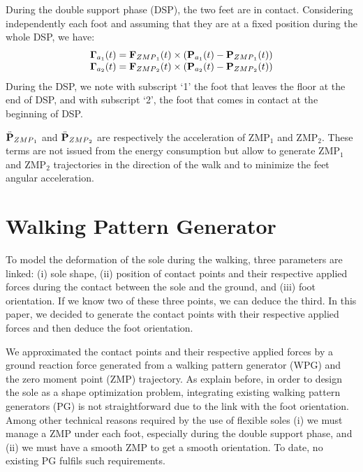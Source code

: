 \documentclass[journal]{IEEEtran}
\begin{document}
During the double support phase (DSP), the two feet are in contact. Considering independently each foot and assuming that they are at a fixed position during the whole DSP, we have:
\begin{equation}
\label{eq:torque_foot}
\begin{array}{l}
\mathbf{\Gamma}_{a_1}(t)=\mathbf{F}_{\mbox{\tiny ZMP}_1}(t)\times (\textbf{P}_{a_1}(t)-\textbf{P}_{\mbox{\tiny ZMP}_1}(t))\\
\mathbf{\Gamma}_{a_2}(t)=\mathbf{F}_{\mbox{\tiny ZMP}_2}(t)\times (\textbf{P}_{a_2}(t)-\textbf{P}_{\mbox{\tiny ZMP}_2}(t))
\end{array}
\end{equation}
During the DSP, we note with subscript `1' the foot that leaves the floor at the end of DSP, and with subscript `2', the foot that comes in contact at the beginning of DSP.

$\ddot{\textbf{P}}_{\mbox{\tiny ZMP}_1}$ and $\ddot{\textbf{P}}_{\mbox{\tiny ZMP}_2}$ are respectively the acceleration of ZMP$_1$ and ZMP$_2$. These terms are not issued from the energy consumption but allow to generate ZMP$_1$ and ZMP$_2$ trajectories in the direction of the walk and to minimize the feet angular acceleration.
\section{Walking Pattern Generator}
\label{sec:wpg}
To model the deformation of the sole during the walking, three parameters are linked: (i) sole shape, (ii) position of contact points and their respective applied forces during the contact between the sole and the ground, and (iii) foot orientation. If we know two of these three points, we can deduce the third. In this paper, we decided to generate the contact points with their respective applied forces and then deduce the foot orientation.

We approximated the contact points and their respective applied forces by a ground reaction force generated from a walking pattern generator (WPG) and the zero moment point (ZMP) trajectory. As explain before, in order to design the sole as a shape optimization problem, integrating existing walking pattern generators (PG) is not straightforward due to the link with the foot orientation. Among other technical reasons required by the use of flexible soles (i) we must manage a ZMP under each foot, especially during the double support phase, and (ii) we must have a smooth ZMP to get a smooth orientation. To date, no existing PG fulfils such requirements.
\end{document}
